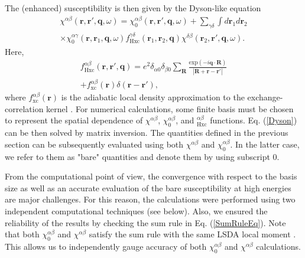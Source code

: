 The (enhanced) susceptibility is then given by the Dyson-like equation
\begin{eqnarray}
\nonumber
\chi^{\alpha\beta}(\mathbf{r},\mathbf{r}',\mathbf{q},\omega)= \chi_0^{\alpha\beta}(\mathbf{r},\mathbf{r}',\mathbf{q},\omega) + \sum_{\gamma\delta}\int d\mathbf{r}_1d\mathbf{r}_2 \\
\times\chi_0^{\alpha\gamma}(\mathbf{r},\mathbf{r}_1,\mathbf{q},\omega)f_{\text{Hxc}}^{\gamma\delta}(\mathbf{r}_1,\mathbf{r}_2,\mathbf{q})\chi^{\delta\beta}(\mathbf{r}_2,\mathbf{r}',\mathbf{q},\omega).
\label{Dyson}
\end{eqnarray}
Here,
\begin{eqnarray}
\nonumber
f^{\alpha\beta}_{\text{Hxc}}(\mathbf{r},\mathbf{r}',\mathbf{q})=e^2\delta_{\alpha 0}\delta_{\beta 0}\sum_{\mathbf{R}}\frac{\text{exp}(-i\mathbf{q}\cdot\mathbf{R})}{|\mathbf{R}+\mathbf{r}-\mathbf{r}'|}\\
+f^{\alpha\beta}_{\text{xc}}(\mathbf{r})\delta(\mathbf{r}-\mathbf{r'}),
\label{fhxc}
\end{eqnarray}
where $f^{\alpha\beta}_{\text{xc}}(\mathbf{r})$ is the adiabatic local density approximation to the exchange-correlation kernel \citep{Gross}. For numerical calculations, some finite basis must be chosen to represent the spatial dependence of $\chi^{\alpha\beta}$, $\chi_0^{\alpha\beta}$, and $^{\alpha\beta}_{\text{Hxc}}$ functions. Eq. (\ref{Dyson}) can be then solved by matrix inversion. The quantities defined in the previous section can be subsequently evaluated using both $\chi^{\alpha\beta}$ and $\chi_0^{\alpha\beta}$. In the latter case, we refer to them as "bare" quantities and denote them by using subscript $0$. 

From the computational point of view, the convergence with respect to the basis size as well as an accurate evaluation of the bare susceptibility at high energies are major challenges. For this reason, the calculations were performed using two independent computational techniques (see below). Also, we ensured the reliability of the results by checking the sum rule in Eq. (\ref{SumRuleEq}). Note that both $\chi_0^{\alpha\beta}$ and $\chi^{\alpha\beta}$ satisfy the sum rule with the same LSDA local moment \citep{Edwards}. This allows us to independently gauge accuracy of both $\chi_0^{\alpha\beta}$ and $\chi^{\alpha\beta}$ calculations.


